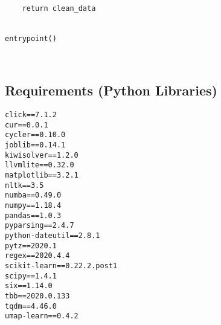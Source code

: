 \documentclass{article}
\begin{document}
\begin{verbatim}
    return clean_data


entrypoint()



\end{verbatim}
\newpage
\subsection{Requirements (Python Libraries)}
\begin{verbatim}
click==7.1.2
cur==0.0.1
cycler==0.10.0
joblib==0.14.1
kiwisolver==1.2.0
llvmlite==0.32.0
matplotlib==3.2.1
nltk==3.5
numba==0.49.0
numpy==1.18.4
pandas==1.0.3
pyparsing==2.4.7
python-dateutil==2.8.1
pytz==2020.1
regex==2020.4.4
scikit-learn==0.22.2.post1
scipy==1.4.1
six==1.14.0
tbb==2020.0.133
tqdm==4.46.0
umap-learn==0.4.2

\end{verbatim}
\end{document}
